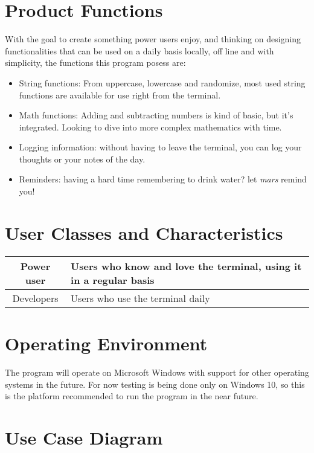 \documentclass{report}
\begin{document}
\section{Product Functions}
With the goal to create something power users enjoy, and thinking on designing functionalities that can be used on a daily basis locally, off line and with simplicity, the functions this program posess are:
\begin{itemize}
\item{String functions: From uppercase, lowercase and randomize, most used string functions are available for use right from the terminal.}
\item{Math functions: Adding and subtracting numbers is kind of basic, but it's integrated. Looking to dive into more complex mathematics with time.}
\item{Logging information: without having to leave the terminal, you can log your thoughts or your notes of the day.}
\item{Reminders: having a hard time remembering to drink water? let \emph{mars} remind you!}
\end{itemize}

\section{User Classes and Characteristics}
\begin{center}
\begin{tabular}{|| c | p{7cm} ||}
\hline
Power user & Users who know and love the terminal, using it in a regular basis \\
\hline
Developers & Users who use the terminal daily \\
\hline
\end{tabular}
\end{center}

\section{Operating Environment}
The program will operate on Microsoft Windows with support for other operating systems in the future. For now testing is being done only on Windows 10, so this is the platform recommended to run the program in the near future.

\section{Use Case Diagram}
\end{document}
